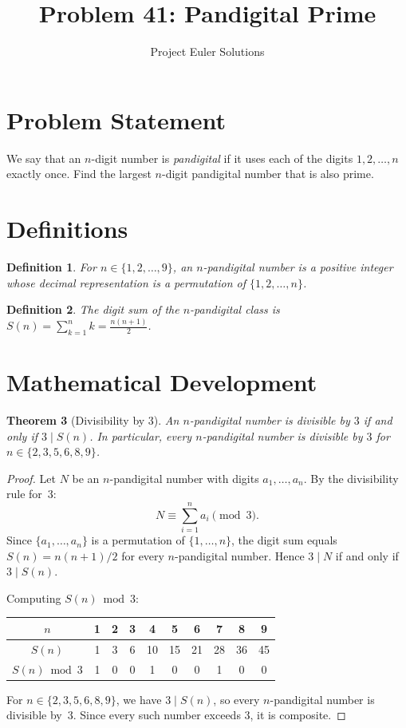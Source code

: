\documentclass[12pt]{article}
\title{Problem 41: Pandigital Prime}
\author{Project Euler Solutions}
\date{}
\newtheorem{theorem}{Theorem}
\newtheorem{definition}[theorem]{Definition}
\begin{document}
\maketitle

\section{Problem Statement}

We say that an $n$-digit number is \emph{pandigital} if it uses each of the digits $1, 2, \ldots, n$ exactly once. Find the largest $n$-digit pandigital number that is also prime.

\section{Definitions}

\begin{definition}
For $n \in \{1, 2, \ldots, 9\}$, an \emph{$n$-pandigital number} is a positive integer whose decimal representation is a permutation of $\{1, 2, \ldots, n\}$.
\end{definition}

\begin{definition}
The \emph{digit sum} of the $n$-pandigital class is $S(n) = \sum_{k=1}^{n} k = \frac{n(n+1)}{2}$.
\end{definition}

\section{Mathematical Development}

\begin{theorem}[Divisibility by 3]
An $n$-pandigital number is divisible by $3$ if and only if $3 \mid S(n)$. In particular, every $n$-pandigital number is divisible by $3$ for $n \in \{2, 3, 5, 6, 8, 9\}$.
\end{theorem}

\begin{proof}
Let $N$ be an $n$-pandigital number with digits $a_1, \ldots, a_n$. By the divisibility rule for~3:
\[
N \equiv \sum_{i=1}^n a_i \pmod{3}.
\]
Since $\{a_1, \ldots, a_n\}$ is a permutation of $\{1, \ldots, n\}$, the digit sum equals $S(n) = n(n+1)/2$ for every $n$-pandigital number. Hence $3 \mid N$ if and only if $3 \mid S(n)$.

Computing $S(n) \bmod 3$:
\begin{center}
\begin{tabular}{c|ccccccccc}
\toprule
$n$ & 1 & 2 & 3 & 4 & 5 & 6 & 7 & 8 & 9 \\
\midrule
$S(n)$ & 1 & 3 & 6 & 10 & 15 & 21 & 28 & 36 & 45 \\
$S(n) \bmod 3$ & 1 & 0 & 0 & 1 & 0 & 0 & 1 & 0 & 0 \\
\bottomrule
\end{tabular}
\end{center}
For $n \in \{2,3,5,6,8,9\}$, we have $3 \mid S(n)$, so every $n$-pandigital number is divisible by~3. Since every such number exceeds 3, it is composite.
\end{proof}
\end{document}
